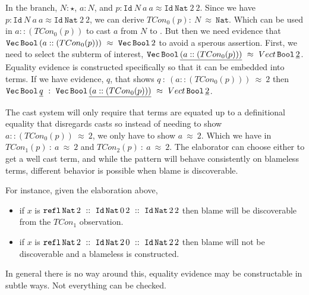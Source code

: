 In the branch, $N:\star$, $a:N$, and $p:\mathtt{Id}\ N\ a\ a\approx\mathtt{Id}\ \mathtt{Nat}\ 2\ 2$.
Since we have $p:\mathtt{Id}\ N\ a\ a\approx\mathtt{Id}\ \mathtt{Nat}\ 2\ 2$, we can derive $TCon_0(p):\ N\ \approx\ \mathtt{Nat}$.
Which can be used in $a::(TCon_0(p))$ to cast $a$ from $N$ to \Nat{}.
But then we need evidence that $\mathtt{Vec}{}\, \mathtt{Bool}{}\, (a :: (TCon_0(p)))\ \approx\ \mathtt{Vec}{}\, \mathtt{Bool}{}\, 2$ to avoid a sperous assertion.
First, we need to select the subterm of interest, $\mathtt{Vec}{}\, \mathtt{Bool}{}\, \underline{(a :: (TCon_0(p)))}\ \approx\ Vect{}\, \mathtt{Bool}{}\, \underline{2}$.
Equality evidence is constructed specifically so that it can be embedded into terms.
If we have evidence, $q$, that shows $q\ :\ (a ::(TCon_0(p)))\ \approx\ 2$ then $\Vect{}\, \Bool{}\, \underline{q}\ :\ \Vect{}\, \Bool{}\, \underline{(a :: (TCon_0(p)))}\ \approx\ Vect{}\, \Bool{}\, \underline{2}$.
 
The cast system will only require that terms are equated up to a definitional equality that disregards casts so instead of needing to show $a :: (TCon_0(p))\ \approx\ 2$, we only have to show $a\ \approx\ 2$.
Which we have in $TCon_1(p)\ :\ a\ \approx\ 2$ and $TCon_2(p)\ :\ a\ \approx\ 2$.
The elaborator can choose either to get a well cast term, and while the pattern will behave consistently on blameless terms, different behavior is possible when blame is discoverable.

For instance, given the elaboration above,
 
\begin{itemize}
  \item if $x$ is $\mathtt{refl}\,\Nat{}\,2\ ::\ \Id{}\,\Nat{}\,0\,2\ ::\ \Id{}\,\Nat{}\,2\,2$ then blame will be discoverable from the $TCon_1$ observation.
  \item if $x$ is $\mathtt{refl}\,\Nat{}\,2\ ::\ \Id{}\,\Nat{}\,2\,0\ ::\ \Id{}\,\Nat{}\,2\,2$ then blame will not be discoverable and a blameless \Vect{} is constructed.
\end{itemize}
In general there is no way around this, equality evidence may be constructable in subtle ways.
Not everything can be checked.

